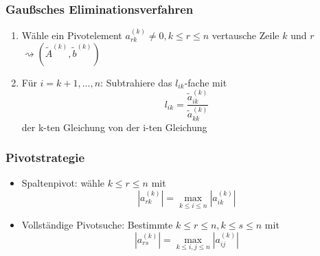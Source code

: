 \documentclass[
	ngerman,
	accentcolor=9c,%
	type=intern,
	marginpar=false
	]{tudapub}
\begin{document}
            \subsubsection{Gaußsches Eliminationsverfahren}
                \begin{enumerate}
                    \item Wähle ein Pivotelement $a^{(k)}_{rk} \not= 0, k\leq r\leq n$ vertausche Zeile $k$ und $r$ $\rightsquigarrow (\tilde{A}^{(k)}, \tilde{b}^{(k)}) $
                    \item Für $i=k+1, \dots, n$: 
                    Subtrahiere das $l_{ik}$-fache mit
                    \begin{equation*}
                        l_{ik} = \dfrac{\tilde{a}^{(k)}_{ik}}{\tilde{a}^{(k)}_{kk}}
                    \end{equation*}
                    der k-ten Gleichung von der i-ten Gleichung
                \end{enumerate}
            \subsubsection{Pivotstrategie}
            \begin{itemize}
                \item Spaltenpivot: wähle $k\leq r \leq n$ mit 
                    \begin{equation*}
                        |a^{(k)}_{rk}| = \max_{k\leq i \leq n} |a^{(k)}_{ik}|
                    \end{equation*}
                \item  Vollständige Pivotsuche: Bestimmte $k\leq r \leq n, k\leq s \leq n$ mit 
                    \begin{equation*}
                        |a^{(k)}_{rs}| = \max_{k\leq i,j \leq n} |a^{(k)}_{ij}|
                    \end{equation*}
            \end{itemize}
\end{document}
